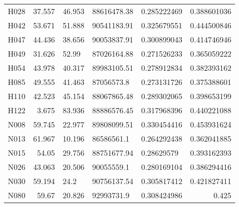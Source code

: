 \begin{table}[!ht]
\begin{tabularx}{\textwidth}{@{}WrZZZr@{}}
H028                    & 37.557           & 46.953           & 88616478.38   & 0.285222469                   & 0.388601036                           \\
H042                    & 53.671           & 51.888           & 90541183.91   & 0.325679551                   & 0.444500846                           \\
H047                    & 44.436           & 38.656           & 90053837.91   & 0.300899043                   & 0.414746946                           \\
H049                    & 31.626           & 52.99            & 87026164.88   & 0.271526233                   & 0.365059222                           \\
H054                    & 43.978           & 40.317           & 89983105.51   & 0.278912834                   & 0.382393162                           \\
H085                    & 49.555           & 41.463           & 87056573.8    & 0.273131726                   & 0.375388601                           \\
H110                    & 42.523           & 45.154           & 88067865.48   & 0.289302065                   & 0.398653199                           \\
H122                    & 3.675            & 83.936           & 88886576.45   & 0.317968396                   & 0.440221088                           \\
N008                    & 59.745           & 22.977           & 89808099.51   & 0.330454416                   & 0.453931624                           \\
N013                    & 61.967           & 10.196           & 86586561.1    & 0.264292438                   & 0.362041885                           \\
N015                    & 54.05            & 29.756           & 88751677.94   & 0.28629579                    & 0.393162393                           \\
N026                    & 43.063           & 20.506           & 90055559.1    & 0.280169104                   & 0.386294416                           \\
N030                    & 59.194           & 24.2             & 90756137.54   & 0.305817412                   & 0.421827411                           \\
N080                    & 59.67            & 20.826           & 92993731.9    & 0.308424986                   & 0.425                                 \\

\end{tabularx}
\end{table}
